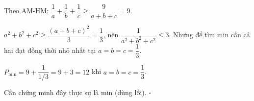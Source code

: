 \begin{loi_giai_cau}
Theo AM-HM: $\dfrac{1}{a}+\dfrac{1}{b}+\dfrac{1}{c}\ge\dfrac{9}{a+b+c}=9$.

$a^2+b^2+c^2\ge\dfrac{(a+b+c)^2}{3}=\dfrac{1}{3}$, nên $\dfrac{1}{a^2+b^2+c^2}\le3$. Nhưng để tìm min cần cả hai đạt đồng thời nhỏ nhất tại $a=b=c=\dfrac{1}{3}$.

$P_{\min}=9+\dfrac{1}{1/3}=9+3=\boxed{12}$ khi $a=b=c=\dfrac{1}{3}$.

Cần chứng minh đây thực sự là min (dùng lồi). $\square$
\end{loi_giai_cau}
